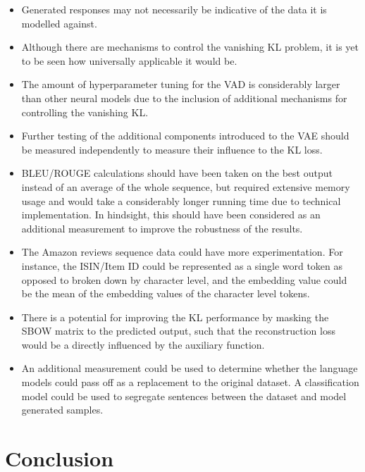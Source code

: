 \documentclass[12pt,twoside]{report}
\begin{document}
\begin{itemize}  
\item Generated responses may not necessarily be indicative of the data it is modelled against.
\item Although there are mechanisms to control the vanishing KL problem, it is yet to be seen how universally applicable it would be.
\item The amount of hyperparameter tuning for the VAD is considerably larger than other neural models due to the inclusion of additional mechanisms for controlling the vanishing KL.
\item Further testing of the additional components introduced to the VAE should be measured independently to measure their influence to the KL loss. 
\item BLEU/ROUGE calculations should have been taken on the best output instead of an average of the whole sequence, but required extensive memory usage and would take a considerably longer running time due to technical implementation. In hindsight, this should have been considered as an additional measurement to improve the robustness of the results.
\item The Amazon reviews sequence data could have more experimentation. For instance, the ISIN/Item ID could be represented as a single word token as opposed to broken down by character level, and the  embedding value could be the mean of the embedding values of the character level tokens.
\item There is a potential for improving the KL performance by masking the SBOW matrix to the predicted output, such that the reconstruction loss would be a directly influenced by the auxiliary function.
\item An additional measurement could be used to determine whether the language models could pass off as a replacement to the original dataset. A classification model could be used to segregate sentences between the dataset and model generated samples. 
\end{itemize}


\chapter{Conclusion}
\end{document}
